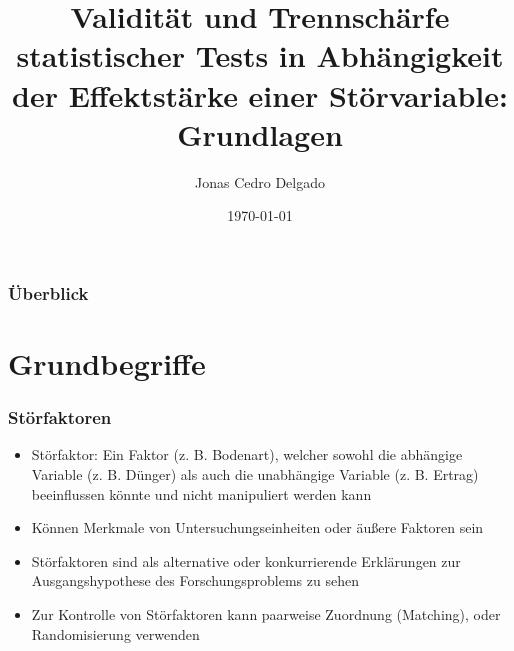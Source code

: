\documentclass{beamer}
\title[Copulas]{Validität und Trennschärfe statistischer Tests in Abhängigkeit der Effektstärke einer Störvariable: Grundlagen} %
\author{Jonas Cedro Delgado} %
\institute[Georg-August-Universität Göttingen] %
{
Georg-August-Universität Göttingen \\ %
\medskip

}
\date{\today} %
\begin{document}
\begin{frame}
\titlepage %
\end{frame}

\begin{frame}
\frametitle{Überblick} %
\tableofcontents %
\end{frame}



\section{Grundbegriffe}
\frame{\sectionpage}

\begin{frame}
\frametitle{Störfaktoren}
\begin{itemize}
\item Störfaktor: Ein Faktor (z. B. Bodenart), welcher sowohl die abhängige Variable (z. B. Dünger) als auch die unabhängige Variable (z. B. Ertrag) beeinflussen könnte und nicht manipuliert werden kann
\item Können Merkmale von Untersuchungseinheiten oder äußere Faktoren sein
\item Störfaktoren sind als alternative oder konkurrierende Erklärungen zur Ausgangshypothese des Forschungsproblems zu sehen
\item Zur Kontrolle von Störfaktoren kann paarweise Zuordnung (Matching), oder Randomisierung verwenden
\end{itemize}
\end{frame}
\end{document}
